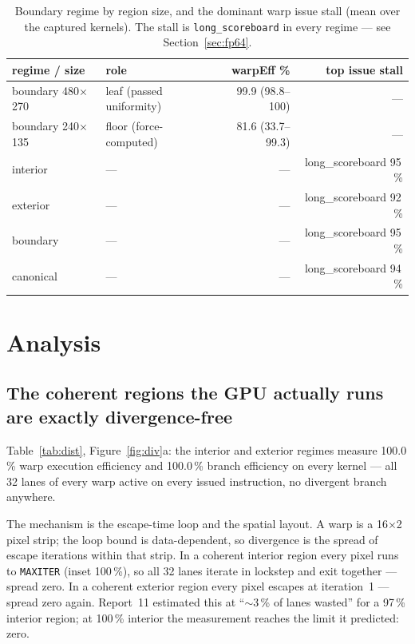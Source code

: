 \documentclass[
	english,
	letterpaper, oneside
]{article}
\begin{document}
\begin{table}[H]
    \centering
    \caption{Boundary regime by region size, and the dominant warp issue stall
             (mean over the captured kernels). The stall is \texttt{long\_scoreboard}
             in every regime --- see Section~\ref{sec:fp64}.}
    \label{tab:size-stall}
    \begin{tabular}{llrr}
        \hline
        regime / size & role & warpEff \% & top issue stall \\
        \hline
        boundary 480$\times$270 & leaf (passed uniformity)   & 99.9 (98.8--100) & --- \\
        boundary 240$\times$135 & floor (force-computed)     & 81.6 (33.7--99.3) & --- \\
        \hline
        interior  & --- & --- & long\_scoreboard 95\,\% \\
        exterior  & --- & --- & long\_scoreboard 92\,\% \\
        boundary  & --- & --- & long\_scoreboard 95\,\% \\
        canonical & --- & --- & long\_scoreboard 94\,\% \\
        \hline
    \end{tabular}
\end{table}

\section{Analysis}

\subsection{The coherent regions the GPU actually runs are exactly
divergence-free}

Table~\ref{tab:dist}, Figure~\ref{fig:div}a: the interior and exterior regimes
measure 100.0\,\% warp execution efficiency and 100.0\,\% branch
efficiency on every kernel --- all 32 lanes of every warp active on every issued
instruction, no divergent branch anywhere.

The mechanism is the escape-time loop and the spatial layout. A warp is a
16$\times$2 pixel strip; the loop bound is data-dependent, so divergence is the
spread of escape iterations within that strip. In a coherent interior
region every pixel runs to \texttt{MAXITER} (inset 100\,\%), so all 32 lanes
iterate in lockstep and exit together --- spread zero. In a coherent exterior
region every pixel escapes at iteration~1 --- spread zero again. Report~11
estimated this at ``$\sim$3\,\% of lanes wasted'' for a 97\,\% interior region;
at 100\,\% interior the measurement reaches the limit it predicted: zero.
\end{document}
